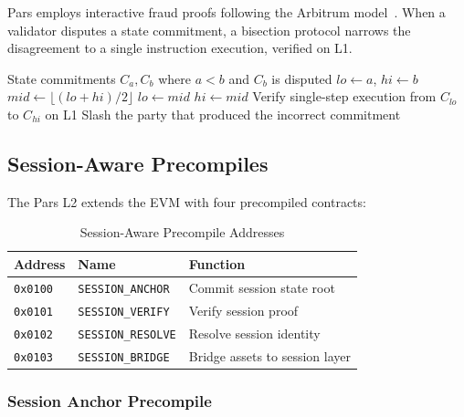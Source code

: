 \documentclass[11pt,a4paper]{article}
\begin{document}
Pars employs interactive fraud proofs following the Arbitrum
model~\cite{kalodner2018arbitrum}.  When a validator disputes a state
commitment, a bisection protocol narrows the disagreement to a single
instruction execution, verified on L1.

\begin{algorithm}[H]
\caption{Interactive Fraud Proof Protocol}
\label{alg:fraud-proof}
\begin{algorithmic}[1]
\Require State commitments $C_a, C_b$ where $a < b$ and $C_b$ is disputed
\State $\mathit{lo} \gets a$,\; $\mathit{hi} \gets b$
    \State $\mathit{mid} \gets \lfloor (\mathit{lo} + \mathit{hi}) / 2 \rfloor$
        \State $\mathit{lo} \gets \mathit{mid}$
    \Else
        \State $\mathit{hi} \gets \mathit{mid}$
    \EndIf
\EndWhile
\State Verify single-step execution from $C_{\mathit{lo}}$ to
       $C_{\mathit{hi}}$ on L1
\State Slash the party that produced the incorrect commitment
\end{algorithmic}
\end{algorithm}

\subsection{Session-Aware Precompiles}

The Pars L2 extends the EVM with four precompiled contracts:

\begin{table}[h]
\centering
\caption{Session-Aware Precompile Addresses}
\label{tab:precompiles}
\begin{tabular}{@{}lll@{}}
\toprule
\textbf{Address} & \textbf{Name} & \textbf{Function} \\
\midrule
\texttt{0x0100} & \texttt{SESSION\_ANCHOR}  & Commit session state root \\
\texttt{0x0101} & \texttt{SESSION\_VERIFY}  & Verify session proof \\
\texttt{0x0102} & \texttt{SESSION\_RESOLVE} & Resolve session identity \\
\texttt{0x0103} & \texttt{SESSION\_BRIDGE}  & Bridge assets to session layer \\
\bottomrule
\end{tabular}
\end{table}

\subsubsection{Session Anchor Precompile}
\end{document}
